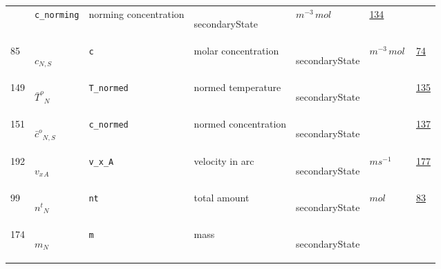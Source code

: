 \begin{longtable}{|p{1cm}|p{2.5cm}|p{4.5cm}|p{8cm}|p{3.0cm}|p{3cm}|p{1cm}|}
             & \verb|c_norming|
             & norming concentration
             & \begin{lay}secondaryState \end{lay}
             & $ m^{-3} \,mol \, $
             &                 \hyperlink{"e:134"}{ 134 }
                 \\
            85
             & \hypertarget{"v:85"}{ $ {c}{_{N, S}} $}
             & \verb|c|
             & molar concentration
             & \begin{lay}secondaryState \end{lay}
             & $ m^{-3} \,mol \, $
             &                 \hyperlink{"e:74"}{ 74 }
                 \\
            149
             & \hypertarget{"v:149"}{ $ {{\bar{T}^o}}{_{N}} $}
             & \verb|T_normed|
             & normed temperature
             & \begin{lay}secondaryState \end{lay}
             & $  $
             &                 \hyperlink{"e:135"}{ 135 }
                 \\
            151
             & \hypertarget{"v:151"}{ $ {{\bar{c}^o}}{_{N, S}} $}
             & \verb|c_normed|
             & normed concentration
             & \begin{lay}secondaryState \end{lay}
             & $  $
             &                 \hyperlink{"e:137"}{ 137 }
                 \\
            192
             & \hypertarget{"v:192"}{ $ {{v_x}}{_{A}} $}
             & \verb|v_x_A|
             & velocity in arc
             & \begin{lay}secondaryState \end{lay}
             & $ m s^{-1} \, $
             &                 \hyperlink{"e:177"}{ 177 }
                 \\
            99
             & \hypertarget{"v:99"}{ $ {{n^t}}{_{N}} $}
             & \verb|nt|
             & total amount
             & \begin{lay}secondaryState \end{lay}
             & $ mol \, $
             &                 \hyperlink{"e:83"}{ 83 }
                 \\
            174
             & \hypertarget{"v:174"}{ $ {m}{_{N}} $}
             & \verb|m|
             & mass
             & \begin{lay}secondaryState \end{lay}

\end{longtable}
